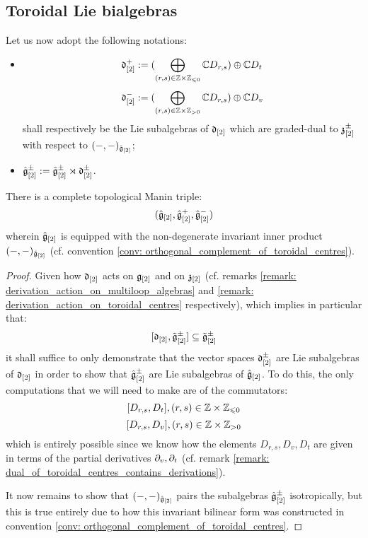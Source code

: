     \subsection{Toroidal Lie bialgebras}
        \begin{convention} \label{conv: positive_and_negative_parts_of_derivation_subalgebras_of_extended_toroidal_algebras}
            Let us now adopt the following notations:
            \begin{itemize}
                \item
                    $$\d_{[2]}^+ := ( \bigoplus_{(r, s) \in \Z \x \Z_{\leq 0} } \bbC D_{r, s} ) \oplus \bbC D_t$$
                    $$\d_{[2]}^- := ( \bigoplus_{(r, s) \in \Z \x \Z_{> 0} } \bbC D_{r, s} ) \oplus \bbC D_v$$
                shall respectively be the Lie subalgebras of $\mathfrak{d}_{[2]}$ which are graded-dual to $\mathfrak{z}_{[2]}^{\pm}$ with respect to $(-, -)_{\hat{\mathfrak{g}}_{[2]}}$;
                \item $\hat{\mathfrak{g}}_{[2]}^{\pm} := \tilde{\mathfrak{g}}_{[2]}^{\pm} \rtimes \mathfrak{d}_{[2]}^{\pm}$.
            \end{itemize}
        \end{convention}    
        \begin{theorem} \label{theorem: extended_toroidal_manin_triples}
            There is a complete topological Manin triple:
                $$(\hat{\mathfrak{g}}_{[2]}, \hat{\mathfrak{g}}_{[2]}^+, \hat{\mathfrak{g}}_{[2]}^-)$$
            wherein $\hat{\mathfrak{g}}_{[2]}$ is equipped with the non-degenerate invariant inner product $(-, -)_{\hat{\mathfrak{g}}_{[2]}}$ (cf. convention \ref{conv: orthogonal_complement_of_toroidal_centres}).
        \end{theorem}
            \begin{proof}
                Given how $\mathfrak{d}_{[2]}$ acts on $\mathfrak{g}_{[2]}$ and on $\mathfrak{z}_{[2]}$ (cf. remarks \ref{remark: derivation_action_on_multiloop_algebras} and \ref{remark: derivation_action_on_toroidal_centres} respectively), which implies in particular that:
                    $$[\mathfrak{d}_{[2]}, \tilde{\mathfrak{g}}_{[2]}^{\pm}] \subseteq \tilde{\mathfrak{g}}_{[2]}^{\pm}$$
                it shall suffice to only demonstrate that the vector spaces $\mathfrak{d}_{[2]}^{\pm}$ are Lie subalgebras of $\mathfrak{d}_{[2]}$ in order to show that $\hat{\mathfrak{g}}_{[2]}^{\pm}$ are Lie subalgebras of $\hat{\mathfrak{g}}_{[2]}$. To do this, the only computations that we will need to make are of the commutators:
                    $$[D_{r, s}, D_t], (r, s) \in \Z \x \Z_{\leq 0}$$
                    $$[D_{r, s}, D_v], (r, s) \in \Z \x \Z_{> 0}$$
                which is entirely possible since we know how the elements $D_{r, s}, D_v, D_t$ are given in terms of the partial derivatives $\partial_v, \partial_t$ (cf. remark \ref{remark: dual_of_toroidal_centres_contains_derivations}).

                It now remains to show that $(-, -)_{\hat{\mathfrak{g}}_{[2]}}$ pairs the subalgebras $\hat{\mathfrak{g}}_{[2]}^{\pm}$ isotropically, but this is true entirely due to how this invariant bilinear form was constructed in convention \ref{conv: orthogonal_complement_of_toroidal_centres}.
            \end{proof}
